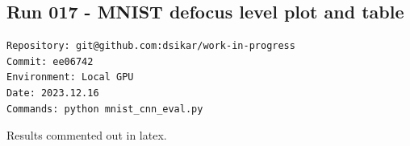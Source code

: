 \subsection{Run 017 - MNIST defocus level plot and table}
\label{app_res:017}
\begin{verbatim}
Repository: git@github.com:dsikar/work-in-progress
Commit: ee06742
Environment: Local GPU
Date: 2023.12.16
Commands: python mnist_cnn_eval.py 
\end{verbatim}

Results commented out in latex. 

